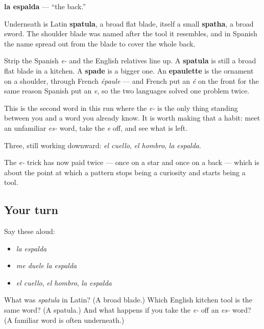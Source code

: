 \begin{cousinweb}
\textbf{la espalda} — \textquotedblleft{}the back.\textquotedblright{}

Underneath is Latin \textbf{spatula}, a broad flat blade, itself a small \textbf{spatha}, a broad sword. The shoulder blade was named after the tool it resembles, and in Spanish the name spread out from the blade to cover the whole back.

Strip the Spanish \emph{e-} and the English relatives line up. A \textbf{spatula} is still a broad flat blade in a kitchen. A \textbf{spade} is a bigger one. An \textbf{epaulette} is the ornament on a shoulder, through French \emph{épaule} — and French put an \emph{é} on the front for the same reason Spanish put an \emph{e}, so the two languages solved one problem twice.

This is the second word in this run where the \emph{e-} is the only thing standing between you and a word you already know. It is worth making that a habit: meet an unfamiliar \emph{es-} word, take the \emph{e} off, and see what is left.
\end{cousinweb}

\begin{grammarlens}[title={What you've built}]
Three, still working downward: \emph{el cuello}, \emph{el hombro}, \emph{la espalda}.

The \emph{e-} trick has now paid twice — once on a star and once on a back — which is about the point at which a pattern stops being a curiosity and starts being a tool.
\end{grammarlens}

\subsection*{Your turn}
Say these aloud:

\begin{itemize}
\raggedright
  \item \emph{la espalda}
  \item \emph{me duele la espalda}
  \item \emph{el cuello}, \emph{el hombro}, \emph{la espalda}
\end{itemize}

\begin{tcolorbox}[breakable,colback=teal!4,colframe=teal!35!black,title={Before you move on}]
What was \emph{spatula} in Latin? (A broad blade.) Which English kitchen tool is the same word? (A spatula.) And what happens if you take the \emph{e-} off an \emph{es-} word? (A familiar word is often underneath.)
\end{tcolorbox}

